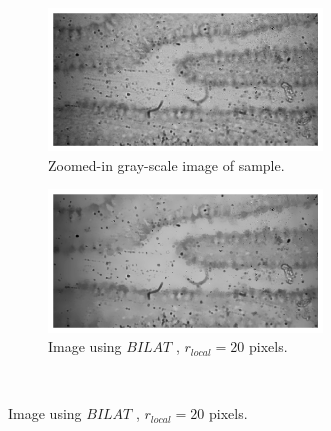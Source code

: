 \begin{figure}[h!]
    \begin{subfigure}[b]{0.5\textwidth}
        \centering
        \includegraphics[width=0.8\textwidth, frame]{afbeeldingen/rank/img.png}
        \caption{Zoomed-in gray-scale image of sample.}
        \label{fig_rank_plain}
    \end{subfigure}
    \begin{subfigure}[b]{0.5\textwidth}
        \centering
        \includegraphics[width=0.8\textwidth, frame]{afbeeldingen/rank/img_bilat.png}
        \caption{Image using $BILAT$ , $r_{local}=20$ pixels.}
        \label{fig_rank_bilat}
    \end{subfigure}
\\


\end{figure}
